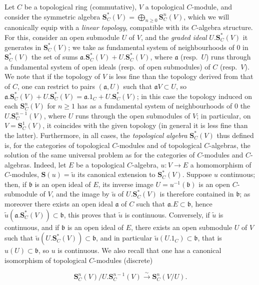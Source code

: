 \begin{env}[19.5.1]
\label{0.19.5.1}
Let $C$ be a topological ring (commutative), $V$ a topological $C$-module, and consider the symmetric algebra $\mathbf{S}_C^*(V)=\bigoplus_{n\geq 0}\mathbf{S}_C^n(V)$, which we will canonically equip with a \emph{linear topology}, compatible with its $C$-algebra structure.
For this, consider an open submodule $U$ of $V$, and the \emph{graded ideal} $U.\mathbf{S}_C^*(V)$ it generates in $\mathbf{S}_C^*(V)$;
we take as fundamental system of neighbourhoods of $0$ in $\mathbf{S}_C^*(V)$ the set of sums $\mathfrak{a}.\mathbf{S}_C^*(V)+U.\mathbf{S}_C^*(V)$, where $\mathfrak{a}$ (resp.\ $U$) runs through a fundamental system of open ideals (resp.\ of open submodules) of $C$ (resp.\ $V$).
We note that if the topology of $V$ is less fine than the topology derived from that of $C$, one can restrict to pairs $(\mathfrak{a},U)$ such that $\mathfrak{a}V\subset U$, so $\mathfrak{a}.\mathbf{S}_C^*(V)+U.\mathbf{S}_C^*(V)=\mathfrak{a}.1_C+U.\mathbf{S}_C^*(V)$;
in this case the topology induced on each $\mathbf{S}_C^n(V)$ for $n\geq 1$ has as a fundamental system of neighbourhoods of $0$ the $U.\mathbf{S}_C^{n-1}(V)$, where $U$ runs through the open submodules of $V$;
in particular, on $V=\mathbf{S}_C^1(V)$, it coincides with the given topology (in general it is less fine than the latter).
Furthermore, in all cases, the \emph{topological algebra} $\mathbf{S}_C^*(V)$ thus defined is, for the categories of topological $C$-modules and of topological $C$-algebras, the solution of the same universal problem as for the categories of $C$-modules and $C$-algebras.
Indeed, let $E$ be a topological $C$-algebra, $u:V\to E$ a homomorphism of $C$-modules, $\mathbf{S}(u)=\widetilde{u}$ its canonical extension to $\mathbf{S}_C^*(V)$.
Suppose $u$ continuous; then, if $\mathfrak{b}$ is an open ideal of $E$, its inverse image $U=u^{-1}(\mathfrak{b})$ is an open $C$-submodule of $V$, and the image by $\widetilde{u}$ of $U.\mathbf{S}_C^*(V)$ is therefore contained in $\mathfrak{b}$;
as moreover there exists an open ideal $\mathfrak{a}$ of $C$ such that $\mathfrak{a}.E\subset\mathfrak{b}$, hence $\widetilde{u}(\mathfrak{a}.\mathbf{S}_C^*(V))\subset\mathfrak{b}$, this proves that $\widetilde{u}$ is continuous.
Conversely, if $\widetilde{u}$ is continuous, and if $\mathfrak{b}$ is an open ideal of $E$, there exists an open submodule $U$ of $V$ such that $\widetilde{u}(U.\mathbf{S}_C^*(V))\subset\mathfrak{b}$, and in particular $\widetilde{u}(U.1_C)\subset\mathfrak{b}$, that is $u(U)\subset\mathfrak{b}$, so $u$ is continuous.
We also recall that one has a canonical isomorphism of topological $C$-modules (discrete)

\[
\mathbf{S}_C^n(V)/U.\mathbf{S}_C^{n-1}(V) \xrightarrow{\sim} \mathbf{S}_C^n(V/U). \tag{19.5.1.1}
\]

\label{0.19.5.1.1}
\end{env}

